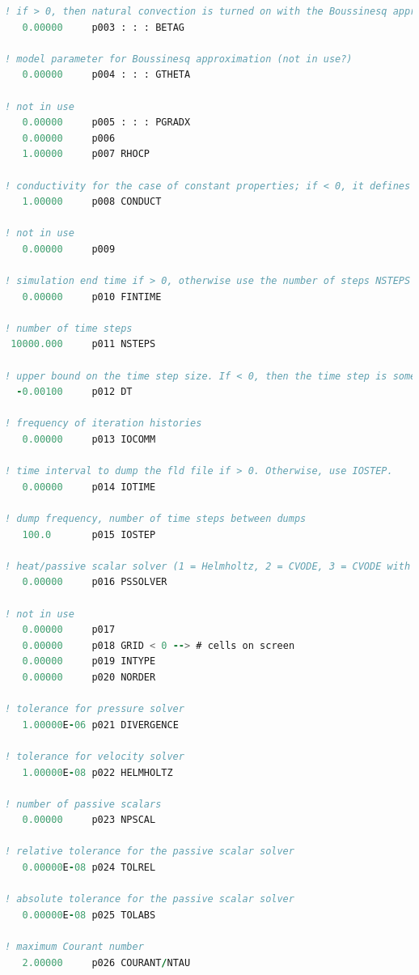 \documentclass[10pt]{article}
\numberwithin{equation}{section} %
\begin{document}
\begin{itemize}
\begin{lstlisting}[language=Fortran]
! if > 0, then natural convection is turned on with the Boussinesq approximation (not in use?)
   0.00000     p003 : : : BETAG
   
! model parameter for Boussinesq approximation (not in use?)
   0.00000     p004 : : : GTHETA
   
! not in use
   0.00000     p005 : : : PGRADX
   0.00000     p006
   1.00000     p007 RHOCP
   
! conductivity for the case of constant properties; if < 0, it defines the Peclet number, and the conductivity is set to -1 divided by the provided value (for the nondimensional form of the energy equation).
   1.00000     p008 CONDUCT
   
! not in use
   0.00000     p009
   
! simulation end time if > 0, otherwise use the number of steps NSTEPS
   0.00000     p010 FINTIME

! number of time steps
 10000.000     p011 NSTEPS
 
! upper bound on the time step size. If < 0, then the time step is some multiple of the number of time steps.
  -0.00100     p012 DT
  
! frequency of iteration histories
   0.00000     p013 IOCOMM
   
! time interval to dump the fld file if > 0. Otherwise, use IOSTEP. 
   0.00000     p014 IOTIME

! dump frequency, number of time steps between dumps
   100.0       p015 IOSTEP
   
! heat/passive scalar solver (1 = Helmholtz, 2 = CVODE, 3 = CVODE with user-supplied Jacobian. A negative number sets source terms to zero), and 0 is default.
   0.00000     p016 PSSOLVER

! not in use
   0.00000     p017
   0.00000     p018 GRID < 0 --> # cells on screen
   0.00000     p019 INTYPE
   0.00000     p020 NORDER

! tolerance for pressure solver
   1.00000E-06 p021 DIVERGENCE
   
! tolerance for velocity solver
   1.00000E-08 p022 HELMHOLTZ
   
! number of passive scalars
   0.00000     p023 NPSCAL
   
! relative tolerance for the passive scalar solver
   0.00000E-08 p024 TOLREL
   
! absolute tolerance for the passive scalar solver
   0.00000E-08 p025 TOLABS
   
! maximum Courant number
   2.00000     p026 COURANT/NTAU
   

\end{lstlisting}
\end{itemize}
\end{document}
